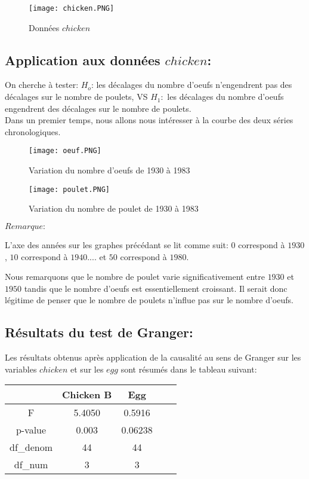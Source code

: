 \documentclass{article}
\begin{document}
\begin{figure}[htbp]
    \centering
    \texttt{[image: chicken.PNG]}
    \caption{Données $chicken$}
    \label{fig:my_label}
\end{figure}

\subsection{Application aux données $chicken$:}

 On cherche à tester: $H_o$: les décalages du nombre d'oeufs n'engendrent pas des décalages sur le nombre de poulets, VS $H_1:$ les décalages du nombre d'oeufs engendrent des décalages sur le nombre de poulets.\\
 Dans un premier temps, nous allons nous intéresser à la courbe des deux séries chronologiques.

\begin{figure}[htbp]
    \centering
    \texttt{[image: oeuf.PNG]}
    \caption{Variation du nombre d'oeufs de 1930 à 1983}
    \label{fig:my_label}
\end{figure}

\begin{figure}[htbp]
    \centering
    \texttt{[image: poulet.PNG]}
    \caption{Variation du nombre de poulet de 1930 à 1983}
    \label{fig:my_label}
\end{figure}

$Remarque:$

\vspace{0.1cm}
L'axe des années sur les graphes précédant se lit comme suit: $0$ correspond à $1930$, $10$ correspond à $1940$.... et $50$ correspond à $1980$.

\vspace{0.2cm}
Nous remarquons que le nombre de poulet varie significativement entre $1930$ et $1950$ tandis que le nombre d'oeufs est essentiellement croissant. Il serait donc légitime de penser que le nombre de poulets n'influe pas sur le nombre d'oeufs.

\subsection{Résultats du test de Granger:}

Les résultats obtenus après application de la causalité au sens de Granger sur les variables $chicken$ et sur les $egg$ sont résumés dans le tableau suivant:
\begin{center}
    \begin{tabular}{|c|c|c|c|c|}
    \hline
         & Chicken B & Egg    \\
         \hline 
         F  & 5.4050 & 0.5916 \\
         p-value  & 0.003 & 0.06238\\
         df_denom & 44 & 44 \\
         df_num & 3  & 3\\
         
         \hline
    \end{tabular}
\end{center} 
\end{document}
